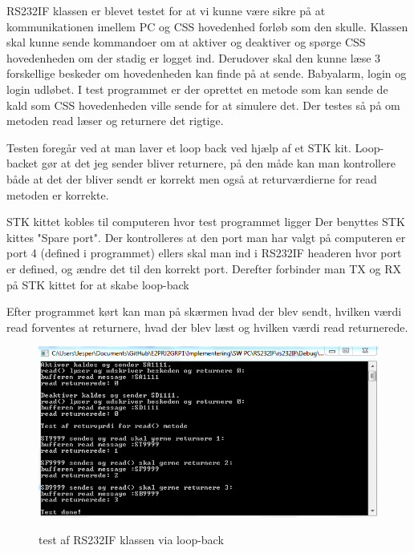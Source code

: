 
RS232IF klassen er blevet testet for at vi kunne være sikre på at kommunikationen imellem PC og CSS hovedenhed forløb som den skulle. Klassen skal kunne sende kommandoer om at aktiver og deaktiver og spørge CSS hovedenheden om der stadig er logget ind. Derudover skal den kunne læse 3 forskellige beskeder om hovedenheden kan finde på at sende. Babyalarm, login og login udløbet. I test programmet er der oprettet en metode som kan sende de kald som CSS hovedenheden ville sende for at simulere det. Der testes så på om metoden read læser og returnere det rigtige. 

\medskip

Testen foregår ved at man laver et loop back ved hjælp af et STK kit. Loop-backet gør at det jeg sender bliver returnere, på den måde kan man kontrollere både at det der bliver sendt er korrekt men også at returværdierne for read metoden er korrekte. 

\medskip

 STK kittet kobles til computeren hvor test programmet ligger Der benyttes STK kittes "Spare port". Der kontrolleres at den port man har valgt på computeren er port 4 (defined i programmet) ellers skal man ind i RS232IF headeren hvor port er defined, og ændre det til den korrekt port. Derefter forbinder man TX og RX på STK kittet for at skabe loop-back
 
 \medskip
Efter programmet kørt kan man på skærmen hvad der blev sendt, hvilken værdi read forventes at returnere, hvad der blev læst og hvilken værdi read returnerede.

\begin{figure}[!htb]
     {\includegraphics[width=\textwidth]{billeder/SWTest/RS232IF_pc_test}}
     \caption{test af RS232IF klassen via loop-back}
     \label{fig:RS232IF klasse test}
\end{figure}